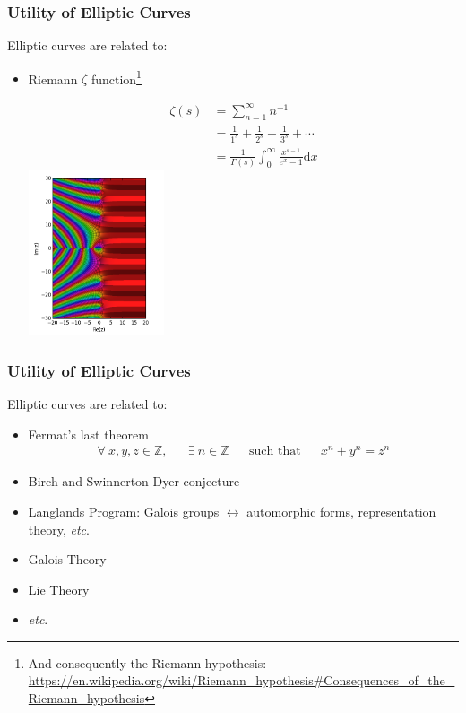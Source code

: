 \documentclass{beamer}
\begin{document}
\begin{frame}
\frametitle{Utility of Elliptic Curves}
Elliptic curves are related to:
\begin{itemize}
  \item Riemann $\zeta$ function\footnote{And consequently the Riemann hypothesis: \url{https://en.wikipedia.org/wiki/Riemann_hypothesis\#Consequences_of_the_Riemann_hypothesis}}
    \begin{multicols}{2}
      \begin{align*}
        \zeta(s) &= \sum_{n=1}^\infty n^{-1} \\
                 &= \frac{1}{1^s} + \frac{1}{2^s} + \frac{1}{3^s} + \cdots \\
                 &= \frac{1}{\Gamma(s)} \int_0^\infty \frac{x^{s - 1}}{e^x -1}\mathrm d x
      \end{align*}
      \columnbreak
      \includegraphics[width=4cm]{Riemann_zeta_function.png}
    \end{multicols}
\end{itemize}
\end{frame}

\begin{frame}
\frametitle{Utility of Elliptic Curves}
Elliptic curves are related to:
\begin{itemize}
  \item Fermat's last theorem
    \begin{align*}
      \forall\ x,y,z \in \mathbb Z, && \exists\ n \in \mathbb Z && \text{such that} && x^n + y^n = z^n
    \end{align*}
  \item Birch and Swinnerton-Dyer conjecture
  \item Langlands Program: Galois groups $\leftrightarrow$ automorphic forms, representation theory, {\it etc}.
  \item Galois Theory
  \item Lie Theory
  \item {\it etc}.
\end{itemize}
\end{frame}
\end{document}
